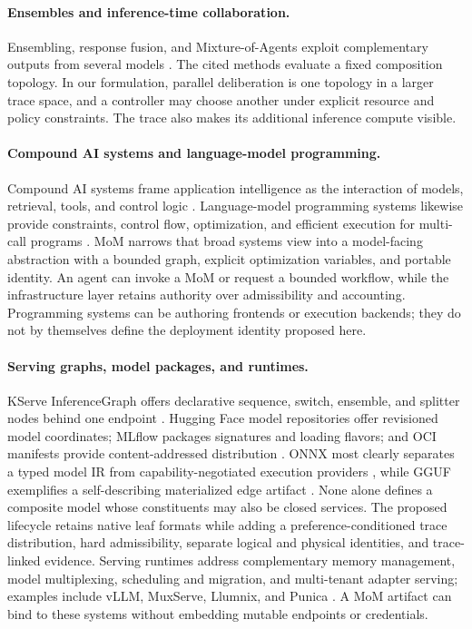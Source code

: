 \paragraph{Ensembles and inference-time collaboration.}
Ensembling, response fusion, and Mixture-of-Agents exploit complementary outputs
from several models \citep{jiang_2023_llmblender,wang_2024_moa,li_2025_selfmoa}.
The cited methods evaluate a fixed composition topology. In our formulation,
parallel deliberation is one topology in a larger trace space, and a controller
may choose another under explicit resource and policy constraints. The trace
also makes its additional inference compute visible.

\paragraph{Compound AI systems and language-model programming.}
Compound AI systems frame application intelligence as the interaction of
models, retrieval, tools, and control logic \citep{kandogan_2024_compound}.
Language-model programming systems likewise provide constraints, control flow,
optimization, and efficient execution for multi-call programs
\citep{beurerkellner_2022_lmql,khattab_2023_dspy,zheng_2023_sglang}.
MoM narrows that broad systems view into a model-facing abstraction with a
bounded graph, explicit optimization variables, and portable identity. An agent
can invoke a MoM or request a bounded workflow, while the infrastructure layer
retains authority over admissibility and accounting. Programming systems can be
authoring frontends or execution backends; they do not by themselves define the
deployment identity proposed here.

\paragraph{Serving graphs, model packages, and runtimes.}
KServe InferenceGraph offers declarative sequence, switch, ensemble, and splitter
nodes behind one endpoint \citep{kserve_2026_inferencegraph}. Hugging Face model
repositories offer revisioned model coordinates; MLflow packages signatures and
loading flavors; and OCI manifests provide content-addressed distribution
\citep{huggingface_2026_models,mlflow_2026_model_format,
oci_2025_image_spec}. ONNX most clearly separates a typed model IR from
capability-negotiated execution providers
\citep{onnx_2026_ir,onnxruntime_2026_execution_providers}, while GGUF exemplifies
a self-describing materialized edge artifact \citep{gguf_2026_spec}. None alone
defines a composite model whose constituents may also be closed services. The
proposed lifecycle retains native leaf formats while adding a
preference-conditioned trace distribution, hard admissibility, separate
logical and physical identities, and trace-linked evidence. Serving runtimes
address complementary memory management, model multiplexing, scheduling and
migration, and multi-tenant adapter serving; examples include vLLM, MuxServe,
Llumnix, and Punica
\citep{kwon_2023_vllm,duan_2024_muxserve,sun_2024_llumnix,chen_2023_punica}.
A MoM artifact can bind to these systems without embedding mutable endpoints or
credentials.


